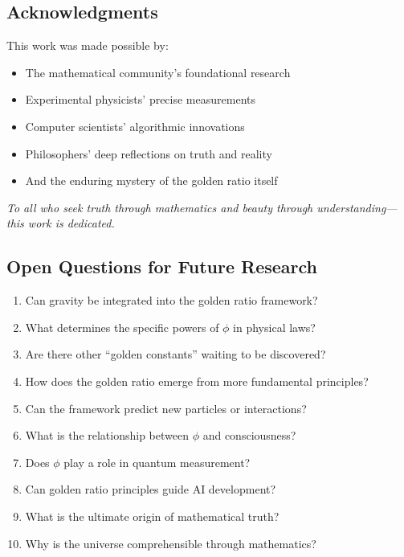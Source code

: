 \subsection*{Acknowledgments}

This work was made possible by:
\begin{itemize}
    \item The mathematical community's foundational research
    \item Experimental physicists' precise measurements
    \item Computer scientists' algorithmic innovations
    \item Philosophers' deep reflections on truth and reality
    \item And the enduring mystery of the golden ratio itself
\end{itemize}

\textit{To all who seek truth through mathematics and beauty through understanding—this work is dedicated.}

\subsection*{Open Questions for Future Research}

\begin{enumerate}
    \item Can gravity be integrated into the golden ratio framework?
    \item What determines the specific powers of $\phi$ in physical laws?
    \item Are there other ``golden constants'' waiting to be discovered?
    \item How does the golden ratio emerge from more fundamental principles?
    \item Can the framework predict new particles or interactions?
    \item What is the relationship between $\phi$ and consciousness?
    \item Does $\phi$ play a role in quantum measurement?
    \item Can golden ratio principles guide AI development?
    \item What is the ultimate origin of mathematical truth?
    \item Why is the universe comprehensible through mathematics?
\end{enumerate}

